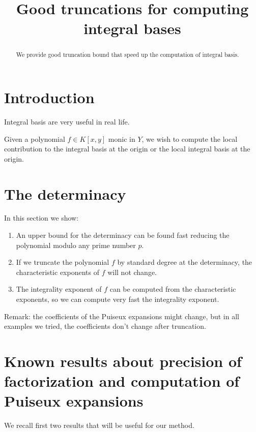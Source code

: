 \documentclass[a4paper,11pt,reqno]{amsart}%
\theoremstyle{definition}
\theoremstyle{plain}
\theoremstyle{remark}
\begin{document}
\title[Good truncations for computing integral bases]{Good truncations for computing integral bases}

\begin{abstract}
We provide good truncation bound that speed up the computation of integral basis.
\end{abstract}
\maketitle

\section{Introduction}
\label{section:introduction}

Integral basis are very useful in real life.

Given a polynomial $f \in K[x,y]$ monic in $Y$, we wish to compute the local contribution to the integral basis at the origin or the local integral basis at the origin.


\section{The determinacy}
\label{section:directApproach}

In this section we show:
\begin{enumerate}
\item An upper bound for the determinacy can be found fast reducing the polynomial modulo any prime number $p$.
\item If we truncate the polynomial $f$ by standard degree at the determinacy, the characteristic exponents of $f$ will not change.
\item The integrality exponent of $f$ can be computed from the characteristic exponents, so we can compute very fast the integrality exponent.
\end{enumerate}

Remark: the coefficients of the Puiseux expansions might change, but in all examples we tried, the coefficients don't change after truncation.

\section{Known results about precision of factorization and computation of Puiseux expansions}

We recall first two results that will be useful for our method.
\end{document}

